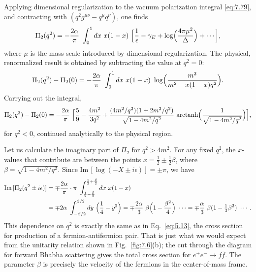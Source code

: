 Applying dimensional regularization to the vacuum polarization integral
\eqref{eq:7.79}, and contracting with $(q^2g^{\mu\nu} - q^\mu q^\nu)$, one
finds
\begin{equation}
  \Pi_2(q^2) = -\frac{2\alpha}{\pi}\ \int_0^1 dx\
    x(1-x)\ \Bigl[ \frac{1}{\epsilon} - \gamma_E + \log\Bigl(
      \frac{4\pi\mu^2}{\Delta} \Bigr) + \cdots \Bigr],
  \label{eq:7.82}
\end{equation}
where $\mu$ is the mass scale introduced by dimensional regularization.  The
physical, renormalized result is obtained by subtracting the value at
$q^2 = 0$:
\begin{equation}
  \Pi_2(q^2) - \Pi_2(0) = -\frac{2\alpha}{\pi}\ \int_0^1 dx\
    x(1-x)\ \log\Bigl( \frac{m^2}{m^2 - x(1-x)q^2} \Bigr) .
  \label{eq:7.91}
\end{equation}
Carrying out the integral,
\begin{equation}
  \Pi_2(q^2) - \Pi_2(0) = -\frac{2\alpha}{\pi}\ \Bigl[
    \frac{5}{9} - \frac{4m^2}{3q^2} + \frac{(4m^2/q^2)(1+2m^2/q^2)}
      {\sqrt{1-4m^2/q^2}}\ \mathrm{arctanh}\Bigl(
        \frac{1}{\sqrt{1-4m^2/q^2}} \Bigr) \Bigr],
  \label{eq:7.91b}
\end{equation}
for $q^2 < 0$, continued analytically to the physical region.

Let us calculate the imaginary part of $\Pi_2$ for $q^2 > 4m^2$.  For any
fixed $q^2$, the $x$-values that contribute are between the points
$x = \tfrac{1}{2}\pm\tfrac{1}{2}\beta$, where
$\beta = \sqrt{1-4m^2/q^2}$.  Since
$\mathrm{Im}\,[\log(-X\pm i\epsilon)] = \pm\pi$, we have
\begin{equation}
  \begin{aligned}
    \mathrm{Im}\,[\Pi_2(q^2\pm i\epsilon)]
    &= \mp \frac{2\alpha}{\pi}\cdot\pi\ \int_{\frac{1}{2}-\frac{\beta}{2}}
      ^{\frac{1}{2}+\frac{\beta}{2}} dx\ x(1-x)\\
    &= \mp 2\alpha\ \int_{-\beta/2}^{\beta/2} dy\ \Bigl(
      \frac{1}{4} - y^2 \Bigr)
    = \mp \frac{2\alpha}{3}\ \beta\Bigl( 1 - \frac{\beta^2}{4} \Bigr)\ \cdots
    = \mp \frac{\alpha}{3}\ \beta(1 - \tfrac{1}{3}\beta^2)\ \cdots .
  \end{aligned}
  \label{eq:7.92}
\end{equation}
This dependence on $q^2$ is exactly the same as in Eq.~\eqref{eq:5.13}, the
cross section for production of a fermion-antifermion pair.  That is just what
we would expect from the unitarity relation shown in Fig.~\ref{fig:7.6}(b);
the cut through the diagram for forward Bhabha scattering gives the total
cross section for $e^{+}e^{-}\to f\bar{f}$.  The parameter $\beta$ is
precisely the velocity of the fermions in the center-of-mass frame.

